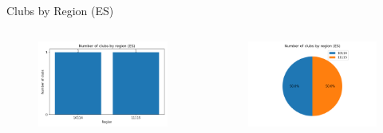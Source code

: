 \documentclass[aspectratio=169, xcolor=dvipsnames]{beamer}
\begin{document}
\begin{frame}{Clubs by Region (ES)}
\begin{columns}[c]
\begin{column}{.45\textwidth}
\begin{figure}
    \centering
    \includegraphics[width=\textwidth]{img/clubsbyregion-es.png}
\end{figure}
\end{column}

\begin{column}{.55\textwidth}
\begin{figure}
    \centering
    \includegraphics[width=\textwidth]{img/clubsbyregion-es-pie.png}
\end{figure}
\end{column}
\end{columns}
\end{frame}
\end{document}
